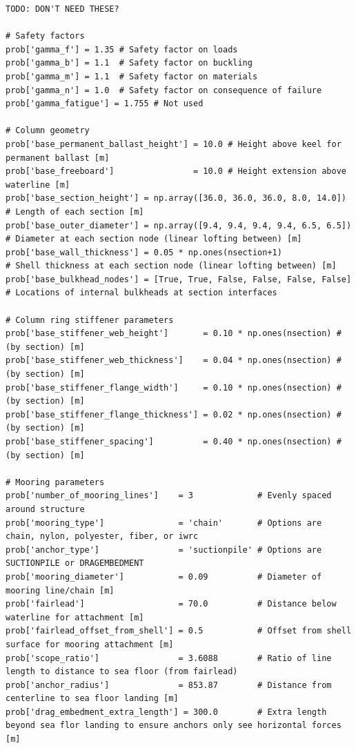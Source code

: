 \begin{lstlisting}
TODO: DON'T NEED THESE?

# Safety factors
prob['gamma_f'] = 1.35 # Safety factor on loads
prob['gamma_b'] = 1.1  # Safety factor on buckling
prob['gamma_m'] = 1.1  # Safety factor on materials
prob['gamma_n'] = 1.0  # Safety factor on consequence of failure
prob['gamma_fatigue'] = 1.755 # Not used

# Column geometry
prob['base_permanent_ballast_height'] = 10.0 # Height above keel for permanent ballast [m]
prob['base_freeboard']                = 10.0 # Height extension above waterline [m]
prob['base_section_height'] = np.array([36.0, 36.0, 36.0, 8.0, 14.0])  # Length of each section [m]
prob['base_outer_diameter'] = np.array([9.4, 9.4, 9.4, 9.4, 6.5, 6.5]) # Diameter at each section node (linear lofting between) [m]
prob['base_wall_thickness'] = 0.05 * np.ones(nsection+1)               # Shell thickness at each section node (linear lofting between) [m]
prob['base_bulkhead_nodes'] = [True, True, False, False, False, False] # Locations of internal bulkheads at section interfaces

# Column ring stiffener parameters
prob['base_stiffener_web_height']       = 0.10 * np.ones(nsection) # (by section) [m]
prob['base_stiffener_web_thickness']    = 0.04 * np.ones(nsection) # (by section) [m]
prob['base_stiffener_flange_width']     = 0.10 * np.ones(nsection) # (by section) [m]
prob['base_stiffener_flange_thickness'] = 0.02 * np.ones(nsection) # (by section) [m]
prob['base_stiffener_spacing']          = 0.40 * np.ones(nsection) # (by section) [m]

# Mooring parameters
prob['number_of_mooring_lines']    = 3             # Evenly spaced around structure
prob['mooring_type']               = 'chain'       # Options are chain, nylon, polyester, fiber, or iwrc
prob['anchor_type']                = 'suctionpile' # Options are SUCTIONPILE or DRAGEMBEDMENT
prob['mooring_diameter']           = 0.09          # Diameter of mooring line/chain [m]
prob['fairlead']                   = 70.0          # Distance below waterline for attachment [m]
prob['fairlead_offset_from_shell'] = 0.5           # Offset from shell surface for mooring attachment [m]
prob['scope_ratio']                = 3.6088        # Ratio of line length to distance to sea floor (from fairlead)
prob['anchor_radius']              = 853.87        # Distance from centerline to sea floor landing [m]
prob['drag_embedment_extra_length'] = 300.0        # Extra length beyond sea flor landing to ensure anchors only see horizontal forces [m]


\end{lstlisting}
